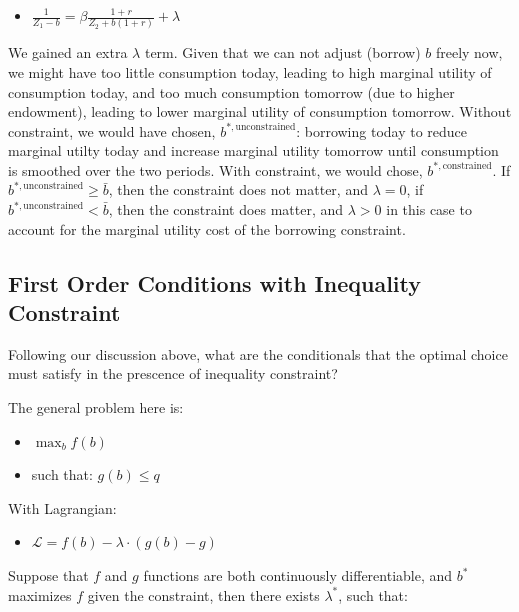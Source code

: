 \documentclass[
]{book}
\providecommand{\tightlist}{%
  \setlength{\itemsep}{0pt}\setlength{\parskip}{0pt}}
\begin{document}
\begin{itemize}
\tightlist
\item
  \(\displaystyle \frac{1}{Z_1 -b}=\beta \frac{1+r}{Z_2 +b(1+r)}+\lambda\)
\end{itemize}

We gained an extra \(\lambda\) term. Given that we can not adjust (borrow)
\(b\) freely now, we might have too little consumption today, leading to
high marginal utility of consumption today, and too much consumption
tomorrow (due to higher endowment), leading to lower marginal utility of
consumption tomorrow. Without constraint, we would have chosen,
\(b^{*,\textrm{unconstrained}}\): borrowing today to reduce marginal
utilty today and increase marginal utility tomorrow until consumption is
smoothed over the two periods. With constraint, we would chose,
\(b^{*,\textrm{constrained}}\). If
\(b^{*,\textrm{unconstrained}} \ge \bar{b}\), then the constraint does not
matter, and \(\lambda =0\), if \(b^{*,\textrm{unconstrained}} <\bar{b}\),
then the constraint does matter, and \(\lambda >0\) in this case to
account for the marginal utility cost of the borrowing constraint.

\hypertarget{first-order-conditions-with-inequality-constraint}{%
\subsection{First Order Conditions with Inequality Constraint}\label{first-order-conditions-with-inequality-constraint}}

Following our discussion above, what are the conditionals that the
optimal choice must satisfy in the prescence of inequality constraint?

The general problem here is:

\begin{itemize}
\item
  \(\displaystyle \max_b f(b)\)
\item
  such that: \(g(b)\le q\)
\end{itemize}

With Lagrangian:

\begin{itemize}
\tightlist
\item
  \(\displaystyle \mathcal{L}=f(b)-\lambda \cdot (g(b)-g)\)
\end{itemize}

Suppose that \(f\) and \(g\) functions are both continuously differentiable,
and \(b^*\) maximizes \(f\) given the constraint, then there exists
\(\lambda^*\), such that:
\end{document}
